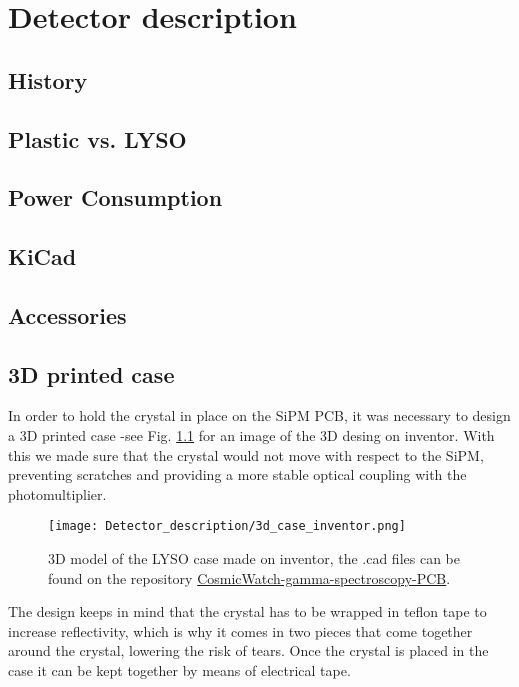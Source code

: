 \chapter{Detector description}

\section{History}

\section{Plastic vs. LYSO}

\section{Power Consumption}

\section{KiCad}

\section{Accessories}

\section{3D printed case}

In order to hold the crystal in place on the SiPM PCB, it was necessary to design a 3D printed case -see Fig. \ref{fig:3d_case_desing} for an image of the 3D desing on inventor. With this we made sure that the crystal would not move with respect to the SiPM, preventing scratches and providing a more stable optical coupling with the photomultiplier.

\begin{figure}[H]
    \centering
    \texttt{[image: Detector\_description/3d\_case\_inventor.png]}
    \caption{3D model of the LYSO case made on inventor, the .cad files can be found on the repository \href{https://github.com/anvargasl/CosmicWatch-gamma-spectroscopy-PCB}{CosmicWatch-gamma-spectroscopy-PCB}.}
    \label{fig:3d_case_desing}
\end{figure}

The design keeps in mind that the crystal has to be wrapped in teflon tape to increase reflectivity, which is why it comes in two pieces that come together around the crystal, lowering the risk of tears. Once the crystal is placed in the case it can be kept together by means of electrical tape.

